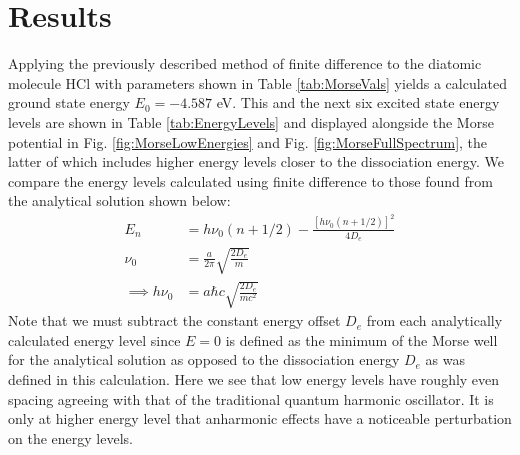 \documentclass[%
aps, %
prl, %
preprint, %
12pt, %
amsfonts, %
amssymb, %
amsmath, %
endfloats,%
raggedbottom, %
]{revtex4-1}
\begin{document}
\section{\label{sec:Results}Results}
Applying the previously described method of finite difference to the diatomic molecule HCl with
parameters shown in Table \ref{tab:MorseVals} yields a calculated ground state energy
$E_0 = -4.587$ eV. This and the next six excited state energy levels are shown in Table
\ref{tab:EnergyLevels} and displayed alongside the Morse potential in Fig.
\ref{fig:MorseLowEnergies} and Fig. \ref{fig:MorseFullSpectrum}, the latter of which includes higher
energy levels closer to the dissociation energy. We compare the energy levels calculated using finite
difference to those found from the analytical solution shown below:
\begin{align}
    E_n &= h\nu_0(n+1/2) - \frac{[h\nu_0(n+1/2)]^2}{4D_e} \\
    \nu_0 &= \frac{a}{2\pi}\sqrt{\frac{2D_e}{m}} \\
    \implies h\nu_0 &= a\hbar c \sqrt{\frac{2D_e}{mc^2}}
\end{align}
Note that we must subtract the constant energy offset $D_e$ from each analytically calculated
energy level since $E = 0$ is defined as the minimum of the Morse well for the analytical
solution as opposed to the dissociation energy $D_e$ as was defined in this calculation. Here we see
that low energy levels have roughly even spacing agreeing with that of the traditional quantum harmonic
oscillator. It is only at higher energy level that anharmonic effects have a noticeable perturbation on
the energy levels.

\begin{table}
\centering
\caption{\label{tab:EnergyLevels}First seven energy levels for the HCl diatomic molecule calculated
using finite difference and analytical methods.}
\noindent{}
\end{table}
\end{document}
